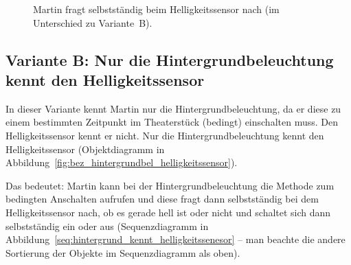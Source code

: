 \documentclass[11pt, a4paper]{scrartcl}
\begin{document}
\hfill
\begin{figure}[H]
\centering
{}
\caption{Martin fragt selbstständig beim Helligkeitssensor nach (im Unterschied zu Variante~B).}
\label{seq:klassische_situation_martin_kennt_hg_hs}
\end{figure}












\newpage
\subsection*{Variante B: Nur die Hintergrundbeleuchtung kennt den Helligkeitssensor}
In dieser Variante kennt Martin nur die Hintergrundbeleuchtung, da er diese zu einem bestimmten Zeitpunkt im Theaterstück (bedingt) einschalten muss. Den Helligkeitssensor kennt er nicht. Nur die Hintergrundbeleuchtung kennt den Helligkeitssensor (Objektdiagramm in Abbildung~\ref{fig:bez_hintergrundbel_helligkeitssensor}).

Das bedeutet: Martin kann bei der Hintergrundbeleuchtung die Methode zum bedingten Anschalten aufrufen und diese fragt dann selbstständig bei dem Helligkeitssensor nach, ob es gerade hell ist oder nicht und schaltet sich dann selbstständig ein oder aus (Sequenzdiagramm in Abbildung~\ref{seq:hintergrund_kennt_helligkeitssenesor} -- man beachte die andere Sortierung der Objekte im Sequenzdiagramm als oben).
\end{document}
